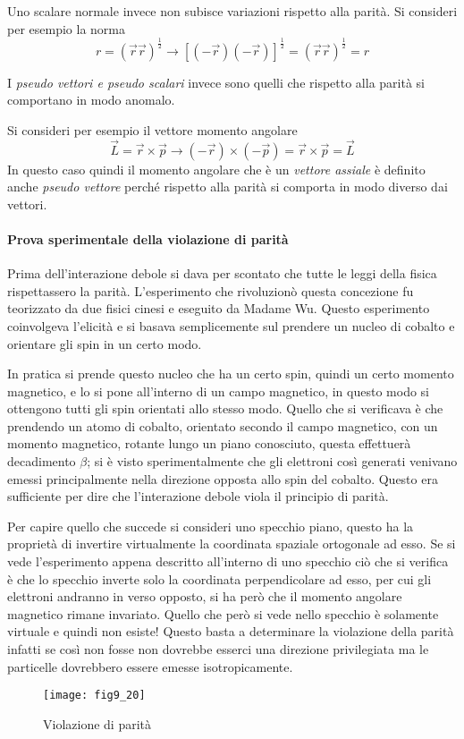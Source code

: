 Uno scalare normale invece non subisce variazioni rispetto alla parità.
Si consideri per esempio  la norma 
\begin{equation}
r=(\vec{r}\vec{r})^{\frac{1}{2}}\to [(-\vec{r})(-\vec{r})]^{\frac{1}{2}}=(\vec{r}\vec{r})^\frac{1}{2}=r
\end{equation}

I \emph{pseudo vettori e pseudo scalari} invece sono quelli che rispetto alla parità si comportano in modo anomalo.

Si consideri per esempio il vettore momento angolare
\begin{equation}
\vec{L}=\vec{r}\times \vec{p}\to (-\vec{r})\times (-\vec{p})=\vec{r}\times \vec{p}=\vec{L}
\end{equation}
In questo caso quindi il momento angolare che è un \emph{vettore assiale} è definito anche \emph{pseudo vettore} perché rispetto alla parità si comporta in modo diverso dai vettori.

\paragraph{Prova sperimentale della violazione di parità}
Prima dell'interazione debole si dava per scontato che tutte le leggi della fisica rispettassero la parità.
L'esperimento che rivoluzionò questa concezione fu teorizzato da due fisici cinesi e eseguito da Madame Wu.
Questo esperimento coinvolgeva l'elicità e si basava semplicemente sul prendere un nucleo di cobalto e orientare gli spin in un certo modo.

In pratica si prende questo nucleo che ha un certo spin, quindi un certo momento magnetico, e lo si pone all'interno di un campo magnetico, in questo modo si ottengono tutti gli spin orientati allo stesso modo.
Quello che si verificava è che prendendo un atomo di cobalto, orientato secondo il campo magnetico, con un momento magnetico, rotante lungo un piano conosciuto, questa effettuerà decadimento $\beta$; si è visto sperimentalmente che gli elettroni così generati venivano emessi principalmente nella direzione opposta allo spin del cobalto.
Questo era sufficiente per dire che l'interazione debole viola il principio di parità.

Per capire quello che succede si consideri uno specchio piano, questo ha la proprietà di invertire virtualmente la coordinata spaziale ortogonale ad esso.
Se si vede l'esperimento appena descritto all'interno di uno specchio ciò che si verifica è che lo specchio inverte solo la coordinata perpendicolare ad esso, per cui gli elettroni andranno in verso opposto, si ha però che il momento angolare magnetico rimane invariato.
Quello che però si vede nello specchio è solamente virtuale e quindi non esiste!
Questo basta a determinare la violazione della parità infatti se così non fosse non dovrebbe esserci una direzione privilegiata ma le particelle dovrebbero essere emesse isotropicamente.
\begin{figure}[h]
\centering
\texttt{[image: fig9\_20]}
\caption{Violazione di parità}
\end{figure}

